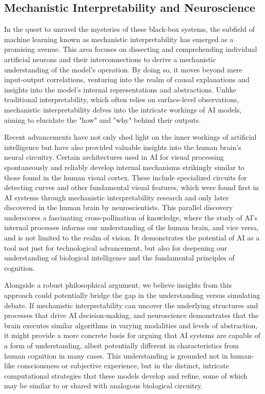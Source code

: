 \documentclass{article}
\begin{document}
\subsection{Mechanistic Interpretability and Neuroscience}
\label{subsec:intro-mechinterp}

In the quest to unravel the mysteries of these black-box systems, the subfield of machine learning known as mechanistic interpretability has emerged as a promising avenue. 
This area focuses on dissecting and comprehending individual artificial neurons and their interconnections to derive a mechanistic understanding of the model's operation. 
By doing so, it moves beyond mere input-output correlations, venturing into the realm of causal explanations and insights into the model's internal representations and abstractions.
Unlike traditional interpretability, which often relies on surface-level observations, mechanistic interpretability delves into the intricate workings of AI models, aiming to elucidate the "how" and "why" behind their outputs.\par

Recent advancements have not only shed light on the inner workings of artificial intelligence but have also provided valuable insights into the human brain's neural circuitry. 
Certain architectures used in AI for visual processing spontaneously and reliably develop internal mechanisms strikingly similar to those found in the human visual cortex. 
These include specialized circuits for detecting curves and other fundamental visual features, which were found first in AI systems through mechanistic interpretability research and only later discovered in the human brain by neuroscientists\cite{}. 
This parallel discovery underscores a fascinating cross-pollination of knowledge, where the study of AI's internal processes informs our understanding of the human brain, and vice versa, and is not limited to the realm of vision\cite{}. 
It demonstrates the potential of AI as a tool not just for technological advancement, but also for deepening our understanding of biological intelligence and the fundamental principles of cognition.\par

Alongside a robust philosophical argument, we believe insights from this approach could potentially bridge the gap in the understanding versus simulating debate. 
If mechanistic interpretability can uncover the underlying structures and processes that drive AI decision-making, and neuroscience demonstrates that the brain executes similar algorithms in varying modalities and levels of abstraction, it might provide a more concrete basis for arguing that AI systems are capable of a form of understanding, albeit potentially different in characteristics from human cognition in many cases. 
This understanding is grounded not in human-like consciousness or subjective experience, but in the distinct, intricate computational strategies that these models develop and refine, some of which may be similar to or shared with analogous biological circuitry.\par
\end{document}
